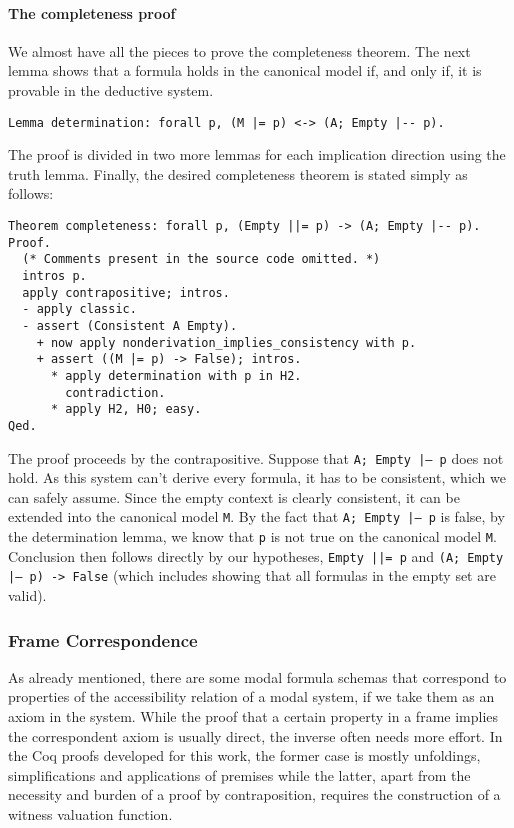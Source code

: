 \documentclass[3p,times]{elsarticle}
\begin{document}
\paragraph{The completeness proof} We almost have all the pieces to prove the completeness theorem. The next lemma
shows that a formula holds in the canonical model if, and only if, it is provable in the deductive system.
\begin{verbatim}
Lemma determination: forall p, (M |= p) <-> (A; Empty |-- p).
\end{verbatim}
The proof is divided in two more lemmas for each implication direction using the truth lemma. Finally, the desired completeness theorem is stated simply as follows:
\begin{verbatim}
Theorem completeness: forall p, (Empty ||= p) -> (A; Empty |-- p).
Proof.
  (* Comments present in the source code omitted. *)
  intros p.
  apply contrapositive; intros.
  - apply classic.
  - assert (Consistent A Empty).
    + now apply nonderivation_implies_consistency with p.
    + assert ((M |= p) -> False); intros.
      * apply determination with p in H2.
        contradiction.
      * apply H2, H0; easy.
Qed.
\end{verbatim}
The proof proceeds by the contrapositive.
Suppose that \texttt{A; Empty |-- p} does not hold.
As this system can't derive every formula, it has to be consistent, which we can safely assume.
Since the empty context is clearly consistent, it
can be extended into the canonical model \verb|M|. By the fact that
\texttt{A; Empty |-- p} is false, by the determination lemma, we know
that \verb|p| is not true on the canonical model \verb|M|. Conclusion then follows directly
by our hypotheses, \texttt{Empty ||= p} and \texttt{(A; Empty |-- p) -> False} (which includes showing that all formulas in the empty set are valid).

\subsubsection{Frame Correspondence}\label{sec:correspondence}

As already mentioned, there are some modal formula schemas that correspond
to properties of the accessibility relation of a modal system, if we take them
as an axiom in the system.  While the proof that a certain property in a frame
implies the correspondent axiom is usually  direct, the inverse often needs
more effort. In the Coq proofs developed for this work,  the former case is
mostly unfoldings, simplifications and applications of premises
while the latter, apart from the necessity and burden of a proof by contraposition,
requires the construction of a witness valuation function.
\end{document}
